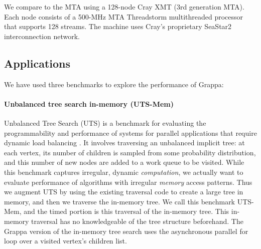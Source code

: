 We compare to the MTA using a 128-node Cray XMT (3rd generation MTA).
Each node consists of a 500-MHz MTA Threadstorm multithreaded processor
that supports 128 streams. The machine uses Cray's proprietary SeaStar2
interconnection network.

\subsection{Applications}

We have used three benchmarks to explore the performance of Grappa:

\paragraph{Unbalanced tree search in-memory (UTS-Mem)} Unbalanced Tree
Search (UTS) is a benchmark for evaluating the programmability and
performance of systems for parallel applications that require dynamic
load balancing \cite{Olivier:uts2006}. It involves traversing an
unbalanced implicit tree: at each vertex, its number of children is
sampled from some probability distribution, and this number of new nodes
are added to a work queue to be visited. While this benchmark captures
irregular, dynamic \emph{computation}, we actually want to evaluate
performance of algorithms with irregular \emph{memory} access patterns.
Thus we augment UTS by using the existing traversal code to create a
large tree in memory, and then we traverse the in-memory tree. We call
this benchmark UTS-Mem, and the timed portion is this traversal of the
in-memory tree. This in-memory traversal has no knowledgeable of the
tree structure beforehand.  The Grappa version of the in-memory tree
search uses the asynchronous parallel for loop over a visited vertex's
children list.


